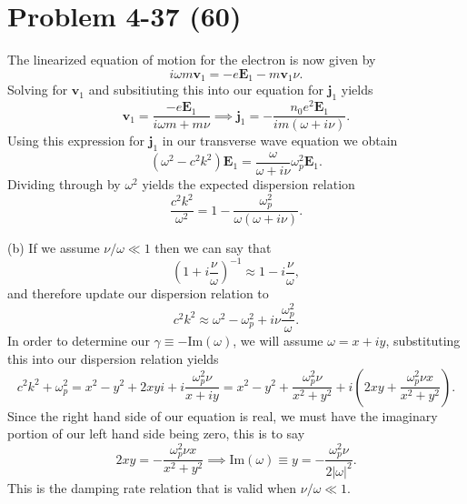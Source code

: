 \section*{Problem 4-37 (60)}
\label{sec:4-37}
The linearized equation of motion for the electron is now given by
\begin{equation*}
	i\omega m \bm{v}_1 = -e\bm{E}_1 - m \bm{v}_1\nu.
\end{equation*}
Solving for \(\bm{v}_1 \) and subsitiuting this into our equation for \(\bm{j}_1 \) yields 
\begin{equation*}
	\bm{v}_1 = \dfrac{-e\bm{E}_1}{i\omega m + m\nu} \implies \bm{j}_1 = -\dfrac{n_0e^2\bm{E}_1}{im(\omega+i\nu)}.
\end{equation*}
Using this expression for \(\bm{j}_1 \) in our transverse wave equation we obtain
\begin{equation*}
	\left(\omega^2 - c^2k^2 \right)\bm{E}_1 = \dfrac{\omega}{\omega + i\nu}\omega_p^2\bm{E}_1.
\end{equation*}
Dividing through by \(\omega^2 \) yields the expected dispersion relation
\begin{equation*}
	\dfrac{c^2k^2}{\omega^2} = 1 - \dfrac{\omega^2_p}{\omega(\omega + i\nu)}.
\end{equation*}

(b) If we assume \(\nu/\omega \ll 1 \) then we can say that 
\begin{equation*}
	\left(1 + i\dfrac{\nu}{\omega} \right)^{-1} \approx 1 - i\dfrac{\nu}{\omega},
\end{equation*}
and therefore update our dispersion relation to 
\begin{equation*}
	c^2k^2 \approx \omega^2 - \omega_p^2 + i\nu\dfrac{\omega^2_p}{\omega}.
\end{equation*}
In order to determine our \(\gamma \equiv -\text{Im}(\omega) \), we will assume \(\omega = x + iy \), substituting this into our dispersion relation yields
\begin{equation*}
	c^2k^2 + \omega_p^2 = x^2 - y^2 + 2xyi + i\dfrac{\omega^2_p\nu}{x+iy} = x^2 - y^2 + \dfrac{\omega_p^2\nu}{x^2+y^2} + i\left(2xy + \dfrac{\omega_p^2\nu x}{x^2+y^2} \right).
\end{equation*}
Since the right hand side of our equation is real, we must have the imaginary portion of our left hand side being zero, this is to say
\begin{equation*}
	2xy =- \dfrac{\omega_p^2\nu x}{x^2+y^2} \implies  \text{Im}(\omega) \equiv y = - \dfrac{\omega_p^2\nu}{2|\omega|^2}.
\end{equation*}
This is the damping rate relation that is valid when \(\nu/\omega \ll 1 \).\\

